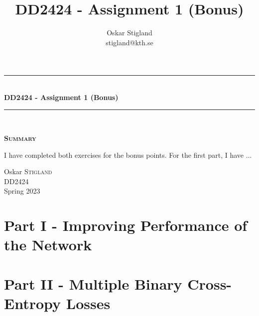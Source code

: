 \documentclass{article}
\title{DD2424 - Assignment 1 (Bonus)}
\author{Oskar Stigland \\ stigland@kth.se}
\begin{document}

	\begin{titlepage}
		\begin{center} 
			
			\rule{\linewidth}{0.5mm}\\[0.5 cm]
			{ \huge \bfseries DD2424 - Assignment 1 (Bonus)}\\[0.3 cm] %
			\rule{\linewidth}{0.5mm}\\[1 cm]
					
			\small\vfill
			\begin{center}
			\centering
			{\large \bfseries \textsc{Summary}}\\
			\vspace{1cm}
			\begin{minipage}{8cm}
				
				I have completed both exercises for the bonus points. For the first part, I have ...
			\end{minipage}
			\end{center}
			\large\vfill
						

		\end{center}	
		
		\begin{minipage}{0.4\textwidth}
			\begin{flushleft} \large
				Oskar \textsc{Stigland}\\
				DD2424\\
				Spring 2023
			\end{flushleft}
		\end{minipage}	

	\end{titlepage}

\newpage
\section*{Part I - Improving Performance of the Network}


\newpage
\section*{Part II - Multiple Binary Cross-Entropy Losses}
\vspace{0.5cm}
\end{document}
